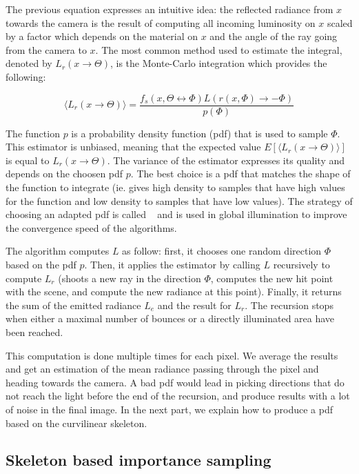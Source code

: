 The previous equation expresses an intuitive idea: the reflected radiance from $x$ towards the camera is the result of computing all incoming luminosity on $x$ scaled by a factor which depends on the material on $x$ and the angle of the ray going from the camera to $x$. The most common method used to estimate the integral, denoted by $L_r(x \rightarrow \Theta)$, is the Monte-Carlo integration which provides the following:

\begin{equation*}
\langle L_r(x \rightarrow \Theta) \rangle = \frac{f_s(x, \Theta \leftrightarrow \Phi) L(r(x, \Phi) \rightarrow -\Phi)}{p(\Phi)}
\end{equation*}

The function $p$ is a probability density function (pdf) that is used to sample $\Phi$. This estimator is unbiased, meaning that the expected value $E[\langle L_r(x \rightarrow \Theta) \rangle]$ is equal to $L_r(x \rightarrow \Theta)$. The variance of the estimator expresses its quality and depends on the choosen pdf $p$. The best choice is a pdf that matches the shape of the function to integrate (ie. gives high density to samples that have high values for the function and low density to samples that have low values).
The strategy of choosing an adapted pdf is called ~\cite{Ka86} and is used in global illumination to improve the convergence speed of the algorithms.

The algorithm computes $L$ as follow: first, it chooses one random direction $\Phi$ based on the pdf $p$. Then, it applies the estimator by calling $L$ recursively to compute $L_r$ (shoots a new ray in the direction $\Phi$, computes the new hit point with the scene, and compute the new radiance at this point). Finally, it returns the sum of the emitted radiance $L_e$ and the result for $L_r$. The recursion stops when either a maximal number of bounces or a directly illuminated area have been reached.

This computation is done multiple times for each pixel. We average the results and get an estimation of the mean radiance passing through the pixel and heading towards the camera.
A bad pdf would lead in picking directions that do not reach the light before the end of the recursion, and produce results with a lot of noise in the final image. In the next part, we explain how to produce a pdf based on the curvilinear skeleton.


\subsection{Skeleton based importance sampling}

